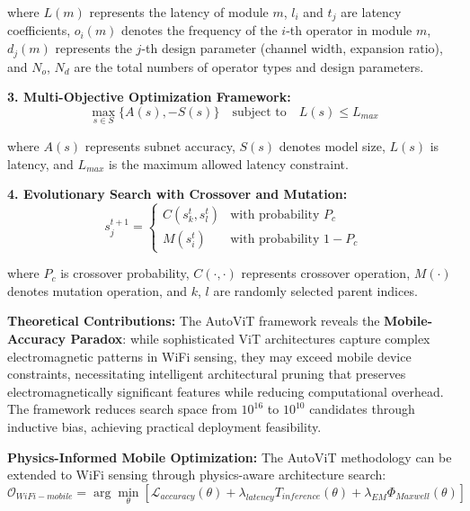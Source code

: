 \documentclass[journal]{IEEEtran}
\begin{document}
where $L(m)$ represents the latency of module $m$, $l_i$ and $t_j$ are latency coefficients, $o_i(m)$ denotes the frequency of the $i$-th operator in module $m$, $d_j(m)$ represents the $j$-th design parameter (channel width, expansion ratio), and $N_o$, $N_d$ are the total numbers of operator types and design parameters.

\textbf{3. Multi-Objective Optimization Framework:}
\begin{equation}
\max_{s \in S} \{A(s), -S(s)\} \quad \text{subject to} \quad L(s) \leq L_{max}
\label{eq:autovit_optimization}
\end{equation}

where $A(s)$ represents subnet accuracy, $S(s)$ denotes model size, $L(s)$ is latency, and $L_{max}$ is the maximum allowed latency constraint.

\textbf{4. Evolutionary Search with Crossover and Mutation:}
\begin{equation}
s_j^{t+1} = \begin{cases}
C(s_k^t, s_l^t) & \text{with probability } P_c \\
M(s_i^t) & \text{with probability } 1 - P_c
\end{cases}
\label{eq:autovit_evolution}
\end{equation}

where $P_c$ is crossover probability, $C(\cdot, \cdot)$ represents crossover operation, $M(\cdot)$ denotes mutation operation, and $k$, $l$ are randomly selected parent indices.

\textbf{Theoretical Contributions:} The AutoViT framework reveals the \textbf{Mobile-Accuracy Paradox}: while sophisticated ViT architectures capture complex electromagnetic patterns in WiFi sensing, they may exceed mobile device constraints, necessitating intelligent architectural pruning that preserves electromagnetically significant features while reducing computational overhead. The framework reduces search space from $10^{16}$ to $10^{10}$ candidates through inductive bias, achieving practical deployment feasibility.

\textbf{Physics-Informed Mobile Optimization:} The AutoViT methodology can be extended to WiFi sensing through physics-aware architecture search:
\begin{equation}
\mathcal{O}_{WiFi-mobile} = \arg\min_{\theta} \left[ \mathcal{L}_{accuracy}(\theta) + \lambda_{latency} T_{inference}(\theta) + \lambda_{EM} \Phi_{Maxwell}(\theta) \right]
\label{eq:wifi_mobile_optimization}
\end{equation}
\end{document}
